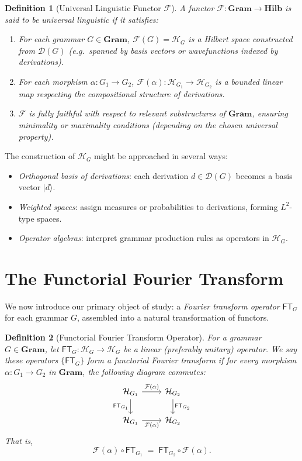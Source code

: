\documentclass[11pt]{article}
\newtheorem{definition}{Definition}[section]
\begin{document}
\begin{definition}[Universal Linguistic Functor \(\mathcal{F}\)]
A functor \(\mathcal{F}: \mathbf{Gram} \to \mathbf{Hilb}\) is said to be \emph{universal linguistic} if it satisfies:
\begin{enumerate}
    \item For each grammar \(G\in\mathbf{Gram}\), \(\mathcal{F}(G) = \mathcal{H}_G\) is a Hilbert space constructed from \(\mathcal{D}(G)\) (e.g.\ spanned by basis vectors or wavefunctions indexed by derivations).
    \item For each morphism \(\alpha: G_1 \to G_2\), \(\mathcal{F}(\alpha) : \mathcal{H}_{G_1} \to \mathcal{H}_{G_2}\) is a bounded linear map respecting the compositional structure of derivations.
    \item \(\mathcal{F}\) is \emph{fully faithful} with respect to relevant substructures of \(\mathbf{Gram}\), ensuring minimality or maximality conditions (depending on the chosen universal property).
\end{enumerate}
\end{definition}

The construction of \(\mathcal{H}_G\) might be approached in several ways:
\begin{itemize}
    \item \emph{Orthogonal basis of derivations}: each derivation \(d \in \mathcal{D}(G)\) becomes a basis vector \(\lvert d \rangle\).
    \item \emph{Weighted spaces}: assign measures or probabilities to derivations, forming \(L^2\)-type spaces.
    \item \emph{Operator algebras}: interpret grammar production rules as operators in \(\mathcal{H}_G\).
\end{itemize}

\section{The Functorial Fourier Transform}

We now introduce our primary object of study: a \emph{Fourier transform operator} \(\mathsf{FT}_G\) for each grammar \(G\), assembled into a natural transformation of functors. 

\begin{definition}[Functorial Fourier Transform Operator]
For a grammar \(G\in \mathbf{Gram}\), let \(\mathsf{FT}_G : \mathcal{H}_G \to \mathcal{H}_G\) be a linear (preferably unitary) operator. We say these operators \(\{\mathsf{FT}_G\}\) form a \emph{functorial Fourier transform} if for every morphism \(\alpha: G_1 \to G_2\) in \(\mathbf{Gram}\), the following diagram commutes:
\[
\begin{tikzcd}
\mathcal{H}_{G_1} \arrow[r, "\mathcal{F}(\alpha)"] \arrow[d, "\mathsf{FT}_{G_1}"']
& \mathcal{H}_{G_2} \arrow[d, "\mathsf{FT}_{G_2}"] \\
\mathcal{H}_{G_1} \arrow[r, "\mathcal{F}(\alpha)"']
& \mathcal{H}_{G_2}
\end{tikzcd}
\]
That is, 
\[
\mathcal{F}(\alpha) \circ \mathsf{FT}_{G_1} \;=\; \mathsf{FT}_{G_2} \circ \mathcal{F}(\alpha).
\]
\end{definition}
\end{document}
